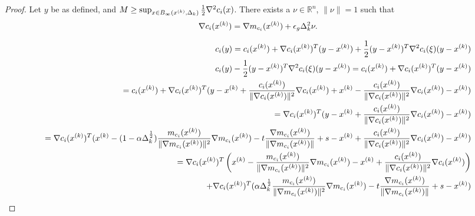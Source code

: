 \begin{proof}
Let $y$ be as defined, and $M \ge \sup_{x \in B_{\infty}({x^{(k)}}, \Delta_k)} \frac 1 2 \nabla^2 c_i(x)$.
There exists a $\nu \in \mathbb R^n$, $\|\nu\|=1$ such that 
\begin{align*}
\nabla c_i({x^{(k)}}) = \nabla m_{c_i}({x^{(k)}}) + \epsilon_{g}\Delta_k^2\nu.
\end{align*}


\begin{align*}
c_i(y) = c_i({x^{(k)}}) + \nabla c_i({x^{(k)}})^T(y - {x^{(k)}}) + \frac 1 2 (y - {x^{(k)}})^T\nabla^2c_i(\xi) (y - {x^{(k)}}) \\
c_i(y) - \frac 1 2 (y - {x^{(k)}})^T\nabla^2c_i(\xi) (y - {x^{(k)}}) = c_i({x^{(k)}}) + \nabla c_i({x^{(k)}})^T(y - {x^{(k)}}) \\
= c_i({x^{(k)}}) + \nabla c_i({x^{(k)}})^T(y - {x^{(k)}} + \frac{c_i({x^{(k)}})}{\|\nabla c_i({x^{(k)}})\|^2}\nabla c_i({x^{(k)}}) + {x^{(k)}} - \frac{c_i({x^{(k)}})}{\|\nabla c_i({x^{(k)}})\|^2}\nabla c_i({x^{(k)}})- {x^{(k)}}) \\
= \nabla c_i({x^{(k)}})^T(y - {x^{(k)}} + \frac{c_i({x^{(k)}})}{\|\nabla c_i({x^{(k)}})\|^2}\nabla c_i({x^{(k)}}) - {x^{(k)}})\\
= \nabla c_i({x^{(k)}})^T({x^{(k)}} - (1 - \alpha\Delta_k^{\frac 1 2})\frac {m_{c_i}({x^{(k)}})}{\|\nabla m_{c_i}({x^{(k)}})\|^2} \nabla m_{c_i}({x^{(k)}}) - t\frac{\nabla m_{c_i}({x^{(k)}})}{\|\nabla m_{c_i}({x^{(k)}})\|} + s - {x^{(k)}} + \frac{c_i({x^{(k)}})}{\|\nabla c_i({x^{(k)}})\|^2}\nabla c_i({x^{(k)}}) - {x^{(k)}}) \\
= \nabla c_i({x^{(k)}})^T \left({x^{(k)}} -\frac {m_{c_i}({x^{(k)}})}{\|\nabla m_{c_i}({x^{(k)}})\|^2} \nabla m_{c_i}({x^{(k)}})- {x^{(k)}} + \frac{c_i({x^{(k)}})}{\|\nabla c_i({x^{(k)}})\|^2}\nabla c_i({x^{(k)}}) \right) \\
+ \nabla c_i({x^{(k)}})^T(\alpha\Delta_k^{\frac 1 2}\frac {m_{c_i}({x^{(k)}})}{\|\nabla m_{c_i}({x^{(k)}})\|^2} \nabla m_{c_i}({x^{(k)}}) - t\frac{\nabla m_{c_i}({x^{(k)}})}{\|\nabla m_{c_i}({x^{(k)}})\|} + s  - {x^{(k)}})
\end{align*}





\end{proof}
